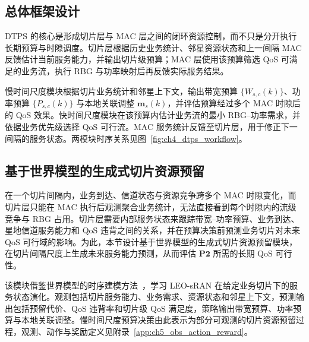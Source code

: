 \subsection{总体框架设计}
\label{subsec:ch4_overview}

DTPS 的核心是形成切片层与 MAC 层之间的闭环资源控制，而不只是分开执行长期预算与时隙调度。切片层根据历史业务统计、邻星资源状态和上一间隔 MAC 反馈估计当前服务能力，并输出切片级预算；MAC 层使用该预算筛选 QoS 可满足的业务流，执行 RBG 与功率映射后再反馈实际服务结果。

慢时间尺度模块根据切片业务统计和邻星上下文，输出带宽预算 $\{W_{s,c}(k)\}$、功率预算 $\{P_{s,c}(k)\}$ 与本地关联调整 $\mathbf m_s(k)$，并评估预算经过多个 MAC 时隙后的 QoS 效果。快时间尺度模块在该预算内估计业务流的最小 RBG--功率需求，并依据业务优先级选择 QoS 可行流。MAC 服务统计反馈至切片层，用于修正下一间隔的服务状态。两模块时序关系见图~\ref{fig:ch4_dtps_workflow}。

\subsection{基于世界模型的生成式切片资源预留}
\label{subsec:ch4_worldmodel}

在一个切片间隔内，业务到达、信道状态与资源竞争跨多个 MAC 时隙变化，而切片层只能在 MAC 执行后观测聚合业务统计，无法直接看到每个时隙内的流级竞争与 RBG 占用。切片层需要内部服务状态来跟踪带宽--功率预算、业务到达、星地信道服务能力和 QoS 违背之间的关系，并在预算决策前预测业务切片对未来 QoS 可行域的影响。为此，本节设计基于世界模型的生成式切片资源预留模块，在切片间隔尺度上生成未来服务能力预测，从而评估 $\mathbf{P2}$ 所需的长期 QoS 可行性。

该模块借鉴世界模型的时序建模方法~\cite{Hafner-WorldModels-arXiv24}，学习 LEO-sRAN 在给定业务切片下的服务状态演化。观测包括切片服务能力、业务需求、资源状态和邻星上下文，预测输出包括预留代价、QoS 违背率和切片级 QoS 满足度，策略输出带宽预算、功率预算与本地关联调整。慢时间尺度预算决策由此表示为部分可观测的切片资源预留过程，观测、动作与奖励定义见附录~\ref{app:ch5_obs_action_reward}。

